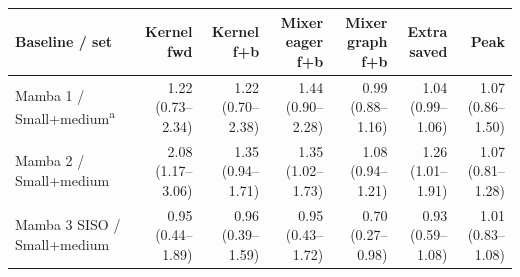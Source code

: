 \begin{tabular}{@{}lrrrrrr@{}}
\toprule
Baseline / set & Kernel fwd & Kernel f+b & Mixer eager f+b & Mixer graph f+b & Extra saved & Peak \\
\midrule
Mamba 1 / Small+medium\textsuperscript{a} & 1.22 (0.73--2.34) & 1.22 (0.70--2.38) & 1.44 (0.90--2.28) & 0.99 (0.88--1.16) & 1.04 (0.99--1.06) & 1.07 (0.86--1.50) \\
Mamba 2 / Small+medium & 2.08 (1.17--3.06) & 1.35 (0.94--1.71) & 1.35 (1.02--1.73) & 1.08 (0.94--1.21) & 1.26 (1.01--1.91) & 1.07 (0.81--1.28) \\
Mamba 3 SISO / Small+medium & 0.95 (0.44--1.89) & 0.96 (0.39--1.59) & 0.95 (0.43--1.72) & 0.70 (0.27--0.98) & 0.93 (0.59--1.08) & 1.01 (0.83--1.08) \\
\bottomrule
\end{tabular}
